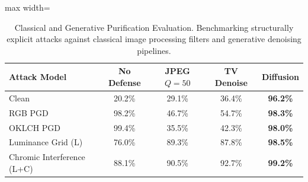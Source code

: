 \begin{table}[htbp]
\centering
\small
\caption{Classical and Generative Purification Evaluation. Benchmarking structurally explicit attacks against classical image processing filters and generative denoising pipelines.}
\label{tab:defenses}
\begin{adjustbox}{max width=\linewidth}
\begin{tabular}{@{}l|c|ccc@{}}
\toprule
\textbf{Attack Model} & \textbf{No Defense} & \textbf{JPEG $Q=50$} & \textbf{TV Denoise} & \textbf{Diffusion} \\ \midrule
Clean & 20.2\% & 29.1\% & 36.4\% & \textbf{96.2\%} \\
RGB PGD & 98.2\% & 46.7\% & 54.7\% & \textbf{98.3\%} \\
OKLCH PGD & 99.4\% & 35.5\% & 42.3\% & \textbf{98.0\%} \\
Luminance Grid (L) & 76.0\% & 89.3\% & 87.8\% & \textbf{98.5\%} \\
Chromic Interference (L+C) & 88.1\% & 90.5\% & 92.7\% & \textbf{99.2\%} \\
\bottomrule
\end{tabular}
\end{adjustbox}
\end{table}
